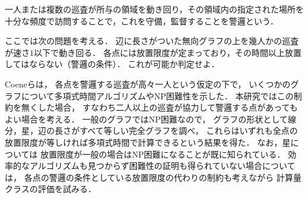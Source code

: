 一人または複数の巡査が所与の領域を動き回り，その領域内の指定された場所を十分な頻度で訪問することで，これを守備，監督することを警邏という．

ここでは次の問題を考える．
辺に長さがついた無向グラフの上を幾人かの巡査が速さ$1$以下で動き回る．
各点には放置限度が定まっており，その時間以上放置してはならない（警邏の条件）．
これが可能か判定せよ．


Coeneらは，
各点を警邏する巡査が高々一人という仮定の下で，
いくつかのグラフについて多項式時間アルゴリズムやNP困難性を示した．
本研究ではこの制約を無くした場合，
すなわち二人以上の巡査が協力して警邏する点があってもよい場合を考える．
一般のグラフではNP困難なので，
グラフの形状として線分，星，辺の長さがすべて等しい完全グラフを調べ，
これらはいずれも全点の放置限度が等しければ多項式時間で計算できるという結果を得た．
なお，星については
放置限度が一般の場合はNP困難になることが既に知られている．
効率的なアルゴリズムも見つからず困難性の証明も得られていない場合については，
各点の警邏の条件としている放置限度の代わりの制約も考えながら
計算量クラスの評価を試みる．
